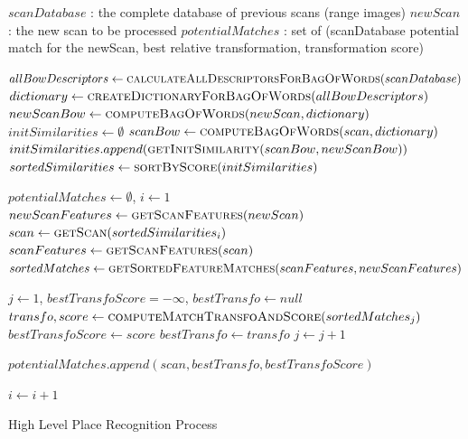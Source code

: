 \begin{algorithm}
    \begin{algorithmic}[1]
        \INPUT
        \Statex $scanDatabase$ : the complete database of previous scans (range images)
        \Statex $newScan$ : the new scan to be processed
        \OUTPUT
        \Statex $potentialMatches$ : set of (scanDatabase potential match for the newScan, best relative transformation, transformation score)
        \Statex

        \State $allBowDescriptors \gets \textsc{calculateAllDescriptorsForBagOfWords}(scanDatabase)$ \label{alg:bow_beginning}
        \State $dictionary \gets \textsc{createDictionaryForBagOfWords}(allBowDescriptors)$
        \State $newScanBow \gets \textsc{computeBagOfWords}(newScan, dictionary)$  \label{alg:create_bow}
        \State \State $initSimilarities \gets \emptyset$ 
        \State $scanBow \gets \textsc{computeBagOfWords}(scan, dictionary)$
        \State $initSimilarities.append(\textsc{getInitSimilarity}(scanBow, newScanBow))$ \label{alg:init_similarities}
        \EndFor
        \State $sortedSimilarities \gets \textsc{sortByScore}(initSimilarities)$ \label{alg:bow_end}

        \State
        \State $potentialMatches \gets \emptyset$, $i \gets 1$ \label{alg:correspondences_beginning}
        \State $newScanFeatures \gets \textsc{getScanFeatures}(newScan)$   \label{alg:features_1}
         \label{alg:timout}
        \State $scan \gets \textsc{getScan}(sortedSimilarities_i)$
        \State $scanFeatures \gets \textsc{getScanFeatures}(scan)$  \label{alg:features_2}
        \State $sortedMatches \gets \textsc{getSortedFeatureMatches}(scanFeatures, newScanFeatures)$ \label{alg:ordered_matches}

        \State
        \State $j \gets 1$, $bestTransfoScore = -\infty$, $bestTransfo \gets null$
        \State $transfo,score \gets \textsc{computeMatchTransfoAndScore}(sortedMatches_j)$
        \State $bestTransfoScore \gets score$
        \State $bestTransfo \gets transfo$
        \EndIf
        \State $j \gets j + 1$
        \EndWhile

        \State
        \State $potentialMatches.append(scan, bestTransfo, bestTransfoScore)$
        \EndIf

        \State
        \State $i \gets i+1$
        \EndWhile \label{alg:correspondences_end}

        \State
        \State {}
        \EndFunction
    \end{algorithmic}

    \caption{High Level Place Recognition Process}
    \label{alg:chap_slam_overview}
\end{algorithm}

